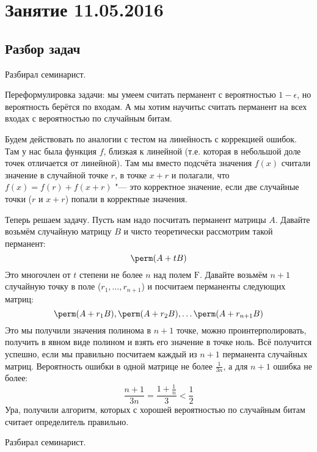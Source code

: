 \chapter{Занятие 11.05.2016}

\section{Разбор задач}
	Разбирал семинарист.

	Переформулировка задачи: мы умеем считать перманент с вероятностью $1-\epsilon$,
	но вероятность берётся по входам.
	А мы хотим научитьс считать перманент на всех входах с вероятностью по случайным битам.

	\begin{Rem}
		Будем действовать по аналогии с тестом на линейность с коррекцией ошибок.
		Там у нас была функция $f$, близкая к линейной (т.е. которая в небольшой доле точек
		отличается от линейной).
		Там мы вместо подсчёта значения $f(x)$ считали значение в случайной точке $r$,
		в точке $x+r$ и полагали, что $f(x)=f(r)+f(x+r)$ "--- это корректное значение,
		если две случайные точки ($r$ и $x+r$) попали в корректные значения.
	\end{Rem}

	Теперь решаем задачу.
	Пусть нам надо посчитать перманент матрицы $A$.
	Давайте возьмём случайную матрицу $B$ и чисто теоретически рассмотрим такой перманент:
	\[ \perm(A + tB) \]
	Это многочлен от $t$ степени не более $n$ над полем $\mathrm{F}$.
	Давайте возьмём $n+1$ случайную точку в поле ($r_1, \dots, r_{n+1}$) и посчитаем перманенты следующих матриц:
	\[
		\perm(A + r_1B),
		\perm(A + r_2B),
		\dots
		\perm(A + r_{n+1}B)
	\]
	Это мы получили значения полинома в $n+1$ точке, можно проинтерполировать, получить в явном виде
	полином и взять его значение в точке ноль.
	Всё получится успешно, если мы правильно посчитаем каждый из $n+1$ перманента случайных матриц.
	Вероятность ошибки в одной матрице не более $\frac{1}{3n}$, а для $n+1$ ошибка не более:
	\[
		\frac{n+1}{3n} = \frac{1+\frac1n}{3} < \frac12
	\]
	Ура, получили алгоритм, которых с хорошей вероятностью по случайным битам считает определитель правильно.

	Разбирал семинарист.

